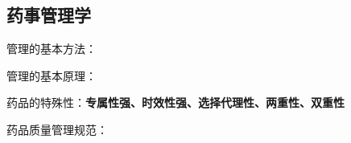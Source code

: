 \subsection{药事管理学}%
\label{sub:复习：药事管理学}
\begin{notation}
    管理的基本方法：
\end{notation}
\begin{notation}
    管理的基本原理：
\end{notation}
\begin{notation}
    药品的特殊性：\textbf{专属性强、时效性强、选择代理性、两重性、双重性}
\end{notation}
\begin{notation}
    药品质量管理规范：
\end{notation}
